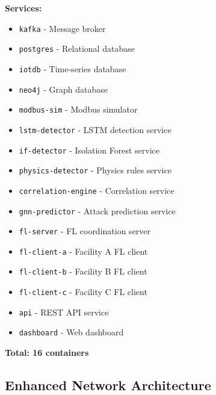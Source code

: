 \documentclass[12pt,a4paper]{article}
\begin{document}
\textbf{Services:}
\begin{itemize}[leftmargin=1cm,itemsep=0pt]
    \item \texttt{kafka} - Message broker
    \item \texttt{postgres} - Relational database
    \item \texttt{iotdb} - Time-series database
    \item \texttt{neo4j} - Graph database
    \item \texttt{modbus-sim} - Modbus simulator
    \item \texttt{lstm-detector} - LSTM detection service
    \item \texttt{if-detector} - Isolation Forest service
    \item \texttt{physics-detector} - Physics rules service
    \item \texttt{correlation-engine} - Correlation service
    \item \texttt{gnn-predictor} - Attack prediction service
    \item \texttt{fl-server} - FL coordination server
    \item \texttt{fl-client-a} - Facility A FL client
    \item \texttt{fl-client-b} - Facility B FL client
    \item \texttt{fl-client-c} - Facility C FL client
    \item \texttt{api} - REST API service
    \item \texttt{dashboard} - Web dashboard
\end{itemize}

\textbf{Total: 16 containers}


\subsection{Enhanced Network Architecture}
\end{document}
